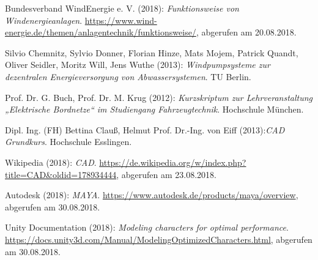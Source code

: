 
\begin{thebibliography}{999}
\label{WindEnergie}
Bundesverband WindEnergie e. V.  (2018): \textit{Funktionsweise von Windenergieanlagen}.\newline
\url{https://www.wind-energie.de/themen/anlagentechnik/funktionsweise/},\newline 
abgerufen am 20.08.2018.

\label{Windpumpsysteme}
Silvio Chemnitz, Sylvio Donner, Florian Hinze, Mats Mojem, Patrick Quandt, Oliver Seidler, Moritz Will, Jens Wuthe (2013): \textit{Windpumpsysteme zur dezentralen Energieversorgung von Abwassersystemen}. TU Berlin.

\label{Bordnetze}
Prof. Dr. G. Buch, Prof. Dr. M. Krug (2012): \textit{Kurzskriptum zur Lehrveranstaltung „Elektrische Bordnetze“ im Studiengang Fahrzeugtechnik}. Hochschule München.

\label{CAD}
Dipl. Ing. (FH) Bettina Clauß, Helmut Prof. Dr.-Ing. von Eiff (2013):\textit{CAD Grundkurs}. Hochschule Esslingen.

\label{WikiCAD}
Wikipedia  (2018): \textit{CAD}.\newline
\url{https://de.wikipedia.org/w/index.php?title=CAD&oldid=178934444},\newline 
abgerufen am 23.08.2018.

\label{Maya}
Autodesk  (2018): \textit{MAYA}.\newline
\url{https://www.autodesk.de/products/maya/overview},\newline 
abgerufen am 30.08.2018.

\label{UnityDocu}
Unity Documentation  (2018): \textit{Modeling characters for optimal performance}.\newline
\url{https://docs.unity3d.com/Manual/ModelingOptimizedCharacters.html},\newline 
abgerufen am 30.08.2018.

\end{thebibliography}
